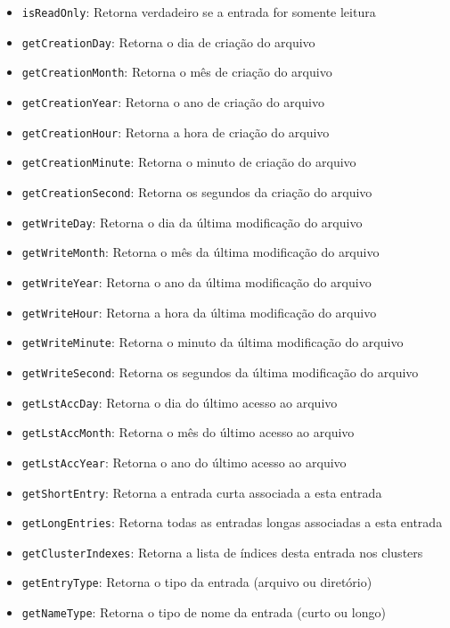 \documentclass[
    12pt,				%
    oneside,   	        %
    a4paper,			%
    english,			%
    french,				%
    spanish,			%
    brazil,				%
    ]{pacotes/abntex2}
\begin{document}
\begin{itemize}
\begin{itemize}
            \item \texttt{isReadOnly}: Retorna verdadeiro se a entrada for somente leitura
            \item \texttt{getCreationDay}: Retorna o dia de criação do arquivo
            \item \texttt{getCreationMonth}: Retorna o mês de criação do arquivo
            \item \texttt{getCreationYear}: Retorna o ano de criação do arquivo
            \item \texttt{getCreationHour}: Retorna a hora de criação do arquivo
            \item \texttt{getCreationMinute}: Retorna o minuto de criação do arquivo
            \item \texttt{getCreationSecond}: Retorna os segundos da criação do arquivo
            \item \texttt{getWriteDay}: Retorna o dia da última modificação do arquivo
            \item \texttt{getWriteMonth}: Retorna o mês da última modificação do arquivo
            \item \texttt{getWriteYear}: Retorna o ano da última modificação do arquivo
            \item \texttt{getWriteHour}: Retorna a hora da última modificação do arquivo
            \item \texttt{getWriteMinute}: Retorna o minuto da última modificação do arquivo
            \item \texttt{getWriteSecond}: Retorna os segundos da última modificação do arquivo
            \item \texttt{getLstAccDay}: Retorna o dia do último acesso ao arquivo
            \item \texttt{getLstAccMonth}: Retorna o mês do último acesso ao arquivo
            \item \texttt{getLstAccYear}: Retorna o ano do último acesso ao arquivo
            \item \texttt{getShortEntry}: Retorna a entrada curta associada a esta entrada
            \item \texttt{getLongEntries}: Retorna todas as entradas longas associadas a esta entrada
            \item \texttt{getClusterIndexes}: Retorna a lista de índices desta entrada nos clusters
            \item \texttt{getEntryType}: Retorna o tipo da entrada (arquivo ou diretório)
            \item \texttt{getNameType}: Retorna o tipo de nome da entrada (curto ou longo)
        \end{itemize}
\end{itemize}
\end{document}
